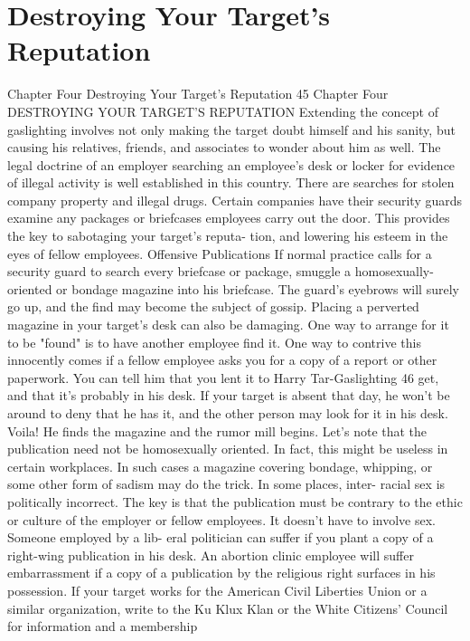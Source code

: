 \documentclass{book}
\begin{document}
\chapter{Destroying Your Target's Reputation}
Chapter Four 
Destroying Your Target's Reputation 
45 
Chapter Four 
DESTROYING YOUR 
TARGET'S REPUTATION 
Extending the concept of gaslighting involves not only 
making the target doubt himself and his sanity, but causing his 
relatives, friends, and associates to wonder about him as well. 
The legal doctrine of an employer searching an employee's 
desk or locker for evidence of illegal activity is well established 
in this country. There are searches for stolen company property 
and illegal drugs. Certain companies have their security guards 
examine any packages or briefcases employees carry out the 
door. This provides the key to sabotaging your target's reputa- 
tion, and lowering his esteem in the eyes of fellow employees. 
Offensive Publications 
If normal practice calls for a security guard to search every 
briefcase or package, smuggle a homosexually-oriented or 
bondage magazine into his briefcase. The guard's eyebrows will 
surely go up, and the find may become the subject of gossip. 
Placing a perverted magazine in your target's desk can also 
be damaging. One way to arrange for it to be "found" is to have 
another employee find it. One way to contrive this innocently 
comes if a fellow employee asks you for a copy of a report or 
other paperwork. You can tell him that you lent it to Harry Tar-Gaslighting 
46 
get, and that it's probably in his desk. If your target is absent 
that day, he won't be around to deny that he has it, and the other 
person may look for it in his desk. Voila! He finds the magazine 
and the rumor mill begins. 
Let's note that the publication need not be homosexually 
oriented. In fact, this might be useless in certain workplaces. In 
such cases a magazine covering bondage, whipping, or some 
other form of sadism may do the trick. In some places, inter- 
racial sex is politically incorrect. The key is that the publication 
must be contrary to the ethic or culture of the employer or 
fellow employees. 
It doesn't have to involve sex. Someone employed by a lib- 
eral politician can suffer if you plant a copy of a right-wing 
publication in his desk. An abortion clinic employee will suffer 
embarrassment if a copy of a publication by the religious right 
surfaces in his possession. 
If your target works for the American Civil Liberties Union 
or a similar organization, write to the Ku Klux Klan or the 
White Citizens’ Council for information and a membership 
\end{document}
